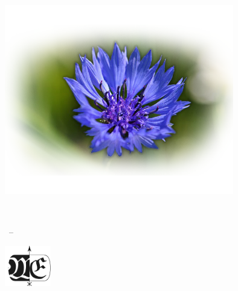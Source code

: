 
\begin{titlepage}

\begin{addmargin}[-1cm]{-3cm}
\begin{center}
\large

\hfill
\vfill

\begingroup
\color{MidnightBlue}\spacedallcaps{\Huge{\myTitle}} \\ \bigskip %
\endgroup

\spacedlowsmallcaps{\myName} %

\vfill

\includegraphics[width=10cm]{img/Estonian_Flower.png} \\ \medskip %

\mySubtitle \\ \medskip %

\myTime\ -- \myVersion %

\vfill

\includegraphics[width=2cm]{img/personal_logo.pdf} \\ \medskip %

\end{center}
\end{addmargin}

\end{titlepage}

